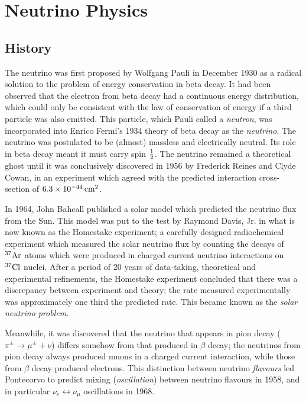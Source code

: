 \chapter{Neutrino Physics}

\section{History}
The neutrino was first proposed by Wolfgang Pauli in December 1930 as a radical solution to the problem of energy conservation in beta decay. It had been observed that the electron from beta decay had a continuous energy distribution, which could only be consistent with the law of conservation of energy if a third particle was also emitted. This particle, which Pauli called a \emph{neutron}, was incorporated into Enrico Fermi's 1934 theory of beta decay as the \emph{neutrino}\citep{Fermi1934,Wilson1968}. The neutrino was postulated to be (almost) massless and electrically neutral. Its role in beta decay meant it must carry spin $\frac{1}{2}$. The neutrino remained a theoretical ghost until it was conclusively discovered in 1956 by Frederick Reines and Clyde Cowan\citep{Reines1956}, in an experiment which agreed with the predicted interaction cross-section of $6.3\times 10^{-44} \,\mathrm{cm}^2$.

In 1964, John Bahcall published a solar model which predicted the neutrino flux from the Sun\citep{Bahcall1964}. This model was put to the test by Raymond Davis, Jr. in what is now known as the Homestake experiment\citep{Davis1964}; a carefully designed radiochemical experiment which measured the solar neutrino flux by counting the decays of $^{37}\mathrm{Ar}$ atoms which were produced in charged current neutrino interactions on $^{37}\mathrm{Cl}$ nuclei. After a period of 20 years of data-taking, theoretical and experimental refinements, the Homestake experiment concluded that there was a discrepancy between experiment and theory; the rate measured experimentally was approximately one third the predicted rate. This became known as the \emph{solar neutrino problem}.

Meanwhile, it was discovered that the neutrino that appears in pion decay ($\pi^\pm \rightarrow \mu^\pm + \nu$) differs somehow from that produced in $\beta$ decay\citep{Danby1962}; the neutrinos from pion decay always produced muons in a charged current interaction, while those from $\beta$ decay produced electrons. This distinction between neutrino \emph{flavours} led Pontecorvo to predict mixing (\emph{oscillation}) between neutrino flavours in 1958\citep{Pontecorvo1958}, and in particular $\nu_e \leftrightarrow \nu_\mu$ oscillations in 1968\citep{Pontecorvo1968}.

